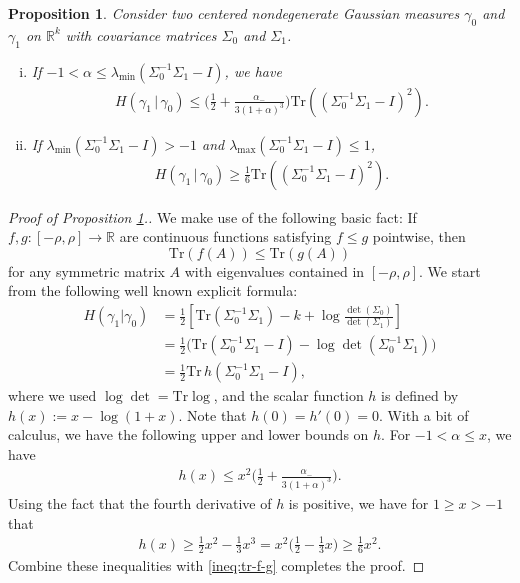 \documentclass[11pt,reqno]{amsart}
\numberwithin{equation}{section}
\newtheorem{proposition}[theorem]{Proposition}
\theoremstyle{definition}
\def\R{{\mathbb R}}
\def\tr{{\mathrm{Tr}}}
\begin{document}
\begin{proposition} \label{prop.static.second.moment.lower.bound}
	Consider two  centered nondegenerate Gaussian measures $\gamma_0$ and $\gamma_1$ on $\R^k$ with covariance matrices $\Sigma_0$ and $\Sigma_1$.
	\begin{enumerate}[(i)]
		\item If $-1<\alpha\le\lambda_{\min}(\Sigma_0^{-1}\Sigma_1 - I)$, we have
		\begin{align*}
			H\left(\gamma_1 \, |\,  \gamma_0 \right) \le  \Big(\frac12 + \frac{\alpha_{-}}{3(1+ \alpha)^3}\Big)\tr((\Sigma_0^{-1}\Sigma_1 - I)^2).
		\end{align*}
		\item If $\lambda_{\min}(\Sigma_0^{-1}\Sigma_1 - I) > -1$ and $\lambda_{\max}(\Sigma_0^{-1}\Sigma_1 - I) \le 1$,
		\begin{align*}
			H\left(\gamma_1 \, |\,  \gamma_0 \right) \ge  \frac{1}{6}\tr((\Sigma_0^{-1}\Sigma_1 - I)^2).
		\end{align*}
	\end{enumerate}
\end{proposition}
\begin{proof}[Proof of Proposition \ref{prop.static.second.moment.lower.bound}.]
We make   use of the following basic fact: If  $f,g : [-\rho,\rho] \to \R$ are continuous functions satisfying $f\le g$ pointwise, then 
\begin{equation}
	\tr( f(A)) \le \tr (g(A)) \label{ineq:tr-f-g}
\end{equation}
for any symmetric matrix $A$ with eigenvalues contained in $[-\rho,\rho]$. 
	We start from the following well known explicit formula:
	\begin{align*}
		H\left(\gamma_1 \vert \gamma_0 \right) &= \frac{1}{2}\left[ \tr\left(\Sigma_0^{-1}\Sigma_1\right) - k + \log\frac{\det(\Sigma_0) }{\det(\Sigma_1 )} \right]\\
		&= \frac12\Big(\tr(\Sigma_0^{-1}\Sigma_1- I) - \log\det(\Sigma_0^{-1}\Sigma_1)\Big) \\
		&= \frac12\tr\,h(\Sigma_0^{-1}\Sigma_1 - I),
	\end{align*}
	where we used $\log\det = \tr \log$, and the scalar function $h$ is defined by $h(x) :=x - \log(1+x)$.
	Note that $h(0)=h'(0)=0$. 
	With a bit of calculus, we have the following upper and lower bounds on $h$. For $-1 < \alpha \le x$, we have
	\begin{align}
		h(x) \le x^2\Big(\frac12 + \frac{\alpha_{-}}{3(1+ \alpha)^3}\Big). \label{h-upperbound}
	\end{align}
	Using the fact that the fourth derivative of $h$ is positive, we have for $1 \ge x > -1$ that
	\begin{align}
		h(x) \ge \frac12 x^2 - \frac13 x^3 = x^2\bigg(\frac12 - \frac13 x\bigg) \ge \frac16 x^2. \label{h-lowerbound}
	\end{align}
	Combine these inequalities with \eqref{ineq:tr-f-g} completes the proof.
\end{proof}
\end{document}
